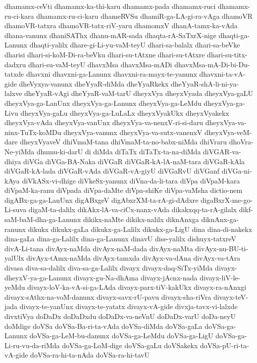 {dhamamx-ceVti
dhamamx-ka-thi-karu
dhamamx-pada
dhamamx-ruci
dhamamx-ru-ci-kara
dhamamx-ru-ci-karu
dhameRVSu
dhamiR-ga-LA-gi-ra-vAga
dhamoVR
dhamoVR-tatxra
dhamoVR-tatx-riV-yaru
dhamomxV
dhanA-tamx-ka-vAda
dhana-vanunx
dhaniSAThx
dhanu-mAR-sada
dhaqta-rA-SaTxrX-nige
dhaqti-ga-Lanunx
dhaqti-yalilx
dhare-gi-Li-yu-vaM-teyU
dhari-sa-balalx
dhari-sa-beVke
dharisi
dhari-si-koM-Di-ra-beVku
dhari-su-tAtxne
dhari-su-tAtxre
dhari-su-titx-dadxru
dhari-su-vaM-teyU
dhavxMsa
dhavxMsa-mADi
dhavxMsa-mA-Di-bi-Du-tatxde
dhavxni
dhavxni-ga-Lanunx
dhavxni-ra-mayx-te-yanunx
dhavxni-ta-vA-gide
dheVyxya-vanunx
dheYyaR-diMda
dheYyaRkekx
dheYyaR-shA-li-ni-ya-lalxve
dheYyaR-vAgi
dheYyaR-vaM-tarU
dheyxVya
dheyxVyada
dheyxVya-gaLU
dheyxVya-ga-LanUnx
dheyxVya-ga-Lanunx
dheyxVya-ga-LeMdu
dheyxVya-ga-Livu
dheyxVya-gaLu
dheyxVya-ga-LuLaLx
dheyxVyakUkx
dheyxVyakekx
dheyxVya-vAda
dheyxVya-vanUnx
dheyxVya-va-nenxV-ri-si-daru
dheyxVya-va-ninx-TuTx-koMDu
dheyxVya-vanunx
dheyxVya-va-sutx-vanenxV
dheyxVya-veM-dare
dheyxVyaveV
dhiVmaM-tana
dhiVmaM-ta-no-babx-niMda
dhiVraru
dhoVra-Ne-yiMda
dhumu-ki-darU
di
diMda
diTaTx
diTaTx-ta-na-diMda
diVGAR-va-dhiya
diVGa
diVGa-BA-Naka
diVGaR
diVGaR-kA-lA-naM-tara
diVGaR-kAla
diVGaR-kA-lada
diVGaR-vAda
diVGaR-vA-giyU
diVGaRvU
diVGanf
diVGa-ni-kAya
diVkASx-vi-dhige
diVkeSx-yanunx
diVna-da-li-tara
diVpa
diVpaM-kara
diVpaM-ka-ranu
diVpada
diVpa-daMte
diVpa-shiKe
diVpa-vaMsha
dictio-nem
digABx-ga-ga-LanUnx
digABxgeV
digAbxrXM-ta-rA-gi-dAdxre
digaBxrX-me-go-Li-suva
digaM-ta-dalilx
dikAkx-lA-va-ciCx-nanx-vAda
dikakxqq-ta-rA-gilalx
dikf-saM-baM-dha-ga-Lanunx
dikikx-naMte
dikikx-nalilx
diknAnxga
diknAnx-ga-ranunx
dikukx
dikukx-gaLa
dikukx-ga-Lalilx
dikukx-ga-LigU
dina
dina-di-nakekx
dina-gaLa
dina-ga-Lalilx
dina-ga-Lanunx
dinavU
dise-yalilx
dishuyx-tatxreV
divA-Li-tana
divAyx-naMda
divAyx-naM-dada
divAyx-naMta
divAyx-nu-BU-ti-yalUlx
divAyx-tAmx-naMda
divAyx-tamxda
divAyx-va-dAna
divAyx-va-tAra
divasa
diva-sa-dalilx
diva-sa-ga-Lalilx
divayx
divayx-daq-SiTx-yiMda
divayx-dheyxV-ya-ga-Lanunx
divayx-gu-Na-dhAma
divayx-jAcnx-nada
divayx-liV-le-yeMdu
divayx-loV-ka-vA-si-ga-LAda
divayx-parx-tiV-kakUkx
divayx-ra-nAnxgi
divayx-sAthx-na-voM-danunx
divayx-savx-rU-pavu
divayx-sha-riVra
divayx-teV-jada
divayx-te-yanUnx
divayx-te-yatatx
divayx-vA-gide
divxja-tavx-vi-lalxde
divxtiVya
doDaDx
doDaDxdu
doDaDx-va-neVnU
doDaDx-varU
doDa-neyU
doMdige
doVSa
doVSa-Ba-ri-ta-vAda
doVSa-diMda
doVSa-gaLa
doVSa-ga-Lanunx
doVSa-ga-LeM-bu-danunx
doVSa-ga-LeMdu
doVSa-ga-LigU
doVSa-ga-Li-ru-vu-da-riMda
doVSa-ga-LoM-dige
doVSa-gaLu
doVSakekx
doVSa-pU-ri-ta-vA-gide
doVSa-ra-hi-ta-nAda
doVSa-ra-hi-tavU
}
